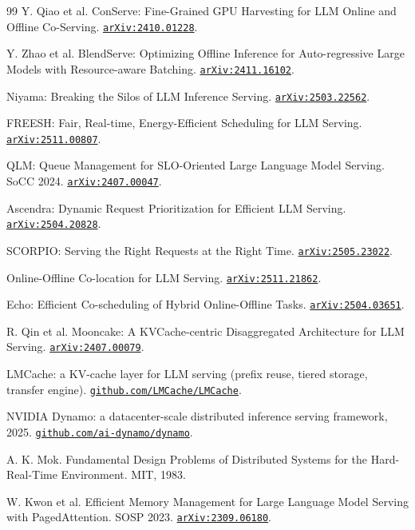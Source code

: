 \documentclass[conference]{IEEEtran}
\newcommand{\code}[1]{\texttt{#1}}
\begin{document}
\begin{thebibliography}{99}
 Y. Qiao et al. ConServe: Fine-Grained GPU Harvesting for LLM Online and
Offline Co-Serving. \href{https://arxiv.org/abs/2410.01228}{\code{arXiv:2410.01228}}.

 Y. Zhao et al. BlendServe: Optimizing Offline Inference for
Auto-regressive Large Models with Resource-aware Batching.
\href{https://arxiv.org/abs/2411.16102}{\code{arXiv:2411.16102}}.

 Niyama: Breaking the Silos of LLM Inference Serving.
\href{https://arxiv.org/abs/2503.22562}{\code{arXiv:2503.22562}}.

 FREESH: Fair, Real-time, Energy-Efficient Scheduling for LLM Serving.
\href{https://arxiv.org/abs/2511.00807}{\code{arXiv:2511.00807}}.

 QLM: Queue Management for SLO-Oriented Large Language Model Serving. SoCC
2024. \href{https://arxiv.org/abs/2407.00047}{\code{arXiv:2407.00047}}.

 Ascendra: Dynamic Request Prioritization for Efficient LLM Serving.
\href{https://arxiv.org/abs/2504.20828}{\code{arXiv:2504.20828}}.

 SCORPIO: Serving the Right Requests at the Right Time.
\href{https://arxiv.org/abs/2505.23022}{\code{arXiv:2505.23022}}.

 Online-Offline Co-location for LLM Serving.
\href{https://arxiv.org/abs/2511.21862}{\code{arXiv:2511.21862}}.

 Echo: Efficient Co-scheduling of Hybrid Online-Offline Tasks.
\href{https://arxiv.org/abs/2504.03651}{\code{arXiv:2504.03651}}.

 R. Qin et al. Mooncake: A KVCache-centric Disaggregated Architecture for
LLM Serving. \href{https://arxiv.org/abs/2407.00079}{\code{arXiv:2407.00079}}.

 LMCache: a KV-cache layer for LLM serving (prefix reuse, tiered storage,
transfer engine). \href{https://github.com/LMCache/LMCache}{\code{github.com/LMCache/LMCache}}.

 NVIDIA Dynamo: a datacenter-scale distributed inference serving framework,
2025. \href{https://github.com/ai-dynamo/dynamo}{\code{github.com/ai-dynamo/dynamo}}.

 A. K. Mok. Fundamental Design Problems of Distributed Systems for the Hard-
Real-Time Environment. MIT, 1983.

 W. Kwon et al. Efficient Memory Management for Large Language Model Serving
with PagedAttention. SOSP 2023.
\href{https://arxiv.org/abs/2309.06180}{\code{arXiv:2309.06180}}.


\end{thebibliography}
\end{document}
